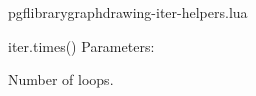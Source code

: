 \begin{filedescription}{pgflibrarygraphdrawing-iter-helpers.lua}
\begin{luacommand}{{iter.times}()}
Parameters:
\begin{parameterdescription}
	\item[\meta{n}] Number of loops. 
\end{parameterdescription}



\end{luacommand}

\end{filedescription}